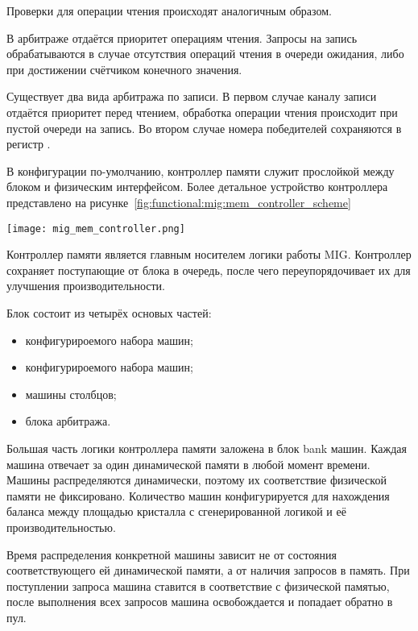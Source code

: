 Проверки для операции чтения происходят аналогичным образом.

В арбитраже  отдаётся приоритет операциям чтения. Запросы на запись
обрабатываются в случае отсутствия операций чтения в очереди ожидания, либо при достижении
счётчиком  конечного значения.

Существует два вида арбитража по записи. В первом случае каналу записи отдаётся приоритет перед чтением,
обработка операции чтения происходит при пустой очереди на запись. Во втором случае номера победителей
сохраняются в регистр .

В конфигурации по-умолчанию, контроллер памяти служит прослойкой между блоком  и физическим
интерфейсом. Более детальное устройство контроллера представлено на рисунке~\ref{fig:functional:mig:mem_controller_scheme}

\begin{center}
  \centering
  \texttt{[image: mig\_mem\_controller.png]}
  \label{fig:functional:mig:mem_controller_scheme}
\end{center}

Контроллер памяти является главным носителем логики работы MIG. Контроллер сохраняет поступающие от блока 
в очередь, после чего переупорядочивает их для улучшения производительности.

Блок состоит из четырёх основых частей:
\begin{itemize}
  \item конфигурироемого набора  машин;
  \item конфигурироемого набора  машин;
  \item машины столбцов;
  \item блока арбитража.
\end{itemize}

Большая часть логики контроллера памяти заложена в блок bank машин. Каждая  машина
отвечает за один  динамической памяти в любой момент времени. Машины распределяются
динамически, поэтому их соответствие физической памяти не фиксировано. Количество машин
конфигурируется для нахождения баланса между площадью кристалла с сгенерированной логикой и
её производительностью.

Время распределения конкретной машины зависит не от состояния соответствующего ей 
динамической памяти, а от наличия запросов в память. При поступлении запроса машина
ставится в соответствие с физической памятью, после выполнения всех запросов машина
освобождается и попадает обратно в пул.

